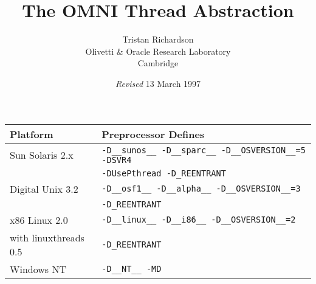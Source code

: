 \documentclass[twoside,11pt,onecolumn]{article}
\title{The OMNI Thread Abstraction}
\author{Tristan Richardson\\ 
Olivetti \& Oracle Research Laboratory \\ 
Cambridge \\ 
}
\date{{\it Revised} 13 March 1997}
\begin{document}
\pagestyle{empty}
{\newpage
\clearpage
\samepage \begin{tabular}{|l|l|} \hline
Platform & Preprocessor Defines \\  \hline \hline
Sun Solaris 2.x & \verb|-D__sunos__ -D__sparc__ -D__OSVERSION__=5 -DSVR4| \\ 
 & \verb|-DUsePthread -D_REENTRANT| \\  \hline
Digital Unix 3.2 & \verb|-D__osf1__ -D__alpha__ -D__OSVERSION__=3| \\ 
 & \verb|-D_REENTRANT| \\  \hline
x86 Linux 2.0 & \verb|-D__linux__ -D__i86__ -D__OSVERSION__=2| \\ 
with linuxthreads 0.5 & \verb|-D_REENTRANT| \\  \hline
Windows NT & \verb|-D__NT__ -MD| \\  \hline
\end{tabular}
}

\end{document}
